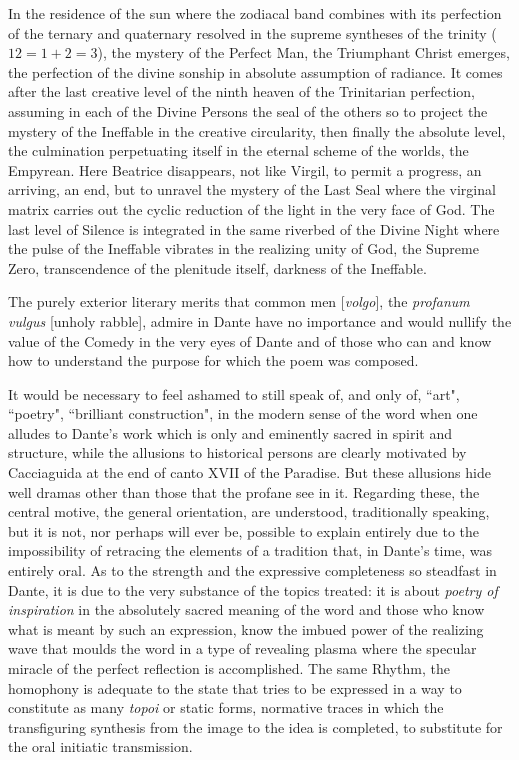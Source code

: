 In the residence of the sun where the zodiacal band combines with its perfection of the ternary and quaternary resolved in the supreme syntheses of the trinity ($12 = 1 + 2 = 3$), the mystery of the Perfect Man, the Triumphant Christ emerges, the perfection of the divine sonship in absolute assumption of radiance. It comes after the last creative level of the ninth heaven of the Trinitarian perfection, assuming in each of the Divine Persons the seal of the others so to project the mystery of the Ineffable in the creative circularity, then finally the absolute level, the culmination perpetuating itself in the eternal scheme of the worlds, the Empyrean. Here Beatrice disappears, not like Virgil, to permit a progress, an arriving, an end, but to unravel the mystery of the Last Seal where the virginal matrix carries out the cyclic reduction of the light in the very face of God. The last level of Silence is integrated in the same riverbed of the Divine Night where the pulse of the Ineffable vibrates in the realizing unity of God, the Supreme Zero, transcendence of the plenitude itself, darkness of the Ineffable.

The purely exterior literary merits that common men [\emph{volgo}], the \emph{profanum vulgus} [unholy rabble], admire in Dante have no importance and would nullify the value of the Comedy in the very eyes of Dante and of those who can and know how to understand the purpose for which the poem was composed.

It would be necessary to feel ashamed to still speak of, and only of, ``art", ``poetry", ``brilliant construction", in the modern sense of the word when one alludes to Dante's work which is only and eminently sacred in spirit and structure, while the allusions to historical persons are clearly motivated by Cacciaguida at the end of canto XVII of the Paradise. But these allusions hide well dramas other than those that the profane see in it. Regarding these, the central motive, the general orientation, are understood, traditionally speaking, but it is not, nor perhaps will ever be, possible to explain entirely due to the impossibility of retracing the elements of a tradition that, in Dante's time, was entirely oral. As to the strength and the expressive completeness so steadfast in Dante, it is due to the very substance of the topics treated: it is about \emph{poetry of inspiration} in the absolutely sacred meaning of the word and those who know what is meant by such an expression, know the imbued power of the realizing wave that moulds the word in a type of revealing plasma where the specular miracle of the perfect reflection is accomplished. The same Rhythm, the homophony is adequate to the state that tries to be expressed in a way to constitute as many \emph{topoi} or static forms, normative traces in which the transfiguring synthesis from the image to the idea is completed, to substitute for the oral initiatic transmission.



